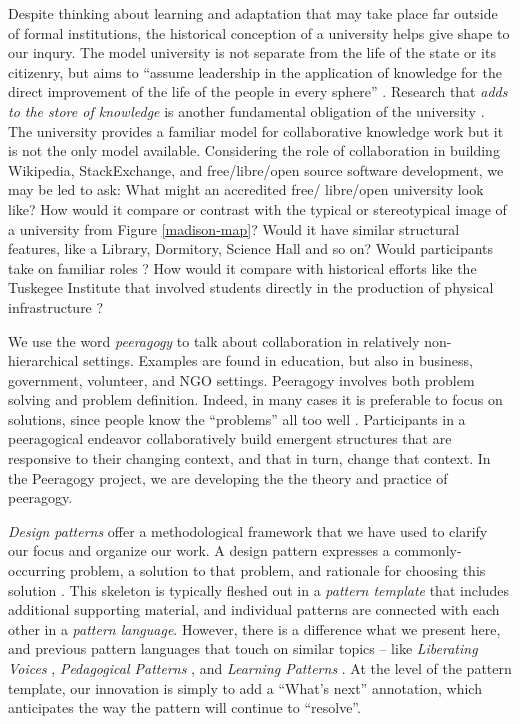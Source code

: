 Despite thinking about learning and adaptation that
may take place far outside of formal institutions, the historical
conception of a university helps give shape to our inqury.
%
The model university is not separate from the life of the state or its
citizenry, but aims to ``assume leadership in the application of
knowledge for the direct improvement of the life of the people in
every sphere'' \cite[p.~88]{curti1949university}. Research that
\emph{adds to the store of knowledge} is another fundamental
obligation of the university \cite[p.~550]{curti1949university}.
The university provides a familiar model for collaborative knowledge work
but it is not the only model available.
Considering the role of collaboration in building Wikipedia,
StackExchange, and free\slash libre\slash open source software
development, we may be led to ask:  What might an accredited free\slash
libre\slash open university look like?  How would it compare or
contrast with the typical or stereotypical image of a university from
Figure \ref{madison-map}?  Would it have similar structural features, like a Library,
Dormitory, Science Hall and so on?  Would participants take
on familiar roles \cite{corneli+crowdsourcing}?  How would it compare
with historical efforts like the Tuskegee Institute that involved
students directly in the production of physical infrastructure
\cite{washington1986up,building-peeragogy-accelerator}?

We use the word \emph{peeragogy} to talk about collaboration in
relatively non-hierarchical settings.  Examples are found in
education, but also in business, government, volunteer, and NGO
settings.  Peeragogy involves both problem solving and problem
definition.  Indeed, in many cases it is preferable to focus on
solutions, since people know the ``problems'' all too well
\cite{ariyaratneXorganizationX1977}.  Participants in a peeragogical
endeavor collaboratively build emergent structures that are responsive
to their changing context, and that in turn, change that context. In
the Peeragogy project, we are developing the the theory and practice
of peeragogy.

\emph{Design patterns} offer a methodological framework that we have
used to clarify our focus and organize our work.  A design pattern
expresses a commonly-occurring problem, a solution to that problem,
and rationale for choosing this solution \cite{meszaros1998pattern}.
This skeleton is typically fleshed out in a \emph{pattern template}
that includes additional supporting material, and individual patterns
are connected with each other in a \emph{pattern language}.  However,
there is a difference what we present here, and previous pattern
languages that touch on similar topics -- like \emph{Liberating
  Voices} \cite{schuler2008liberating}, \emph{Pedagogical Patterns}
\cite{bergin2012pedagogical}, and \emph{Learning Patterns}
\cite{iba2014learning}.  At the level of the pattern template, our
innovation is simply to add a ``What's next'' annotation, which
anticipates the way the pattern will continue to ``resolve''.

